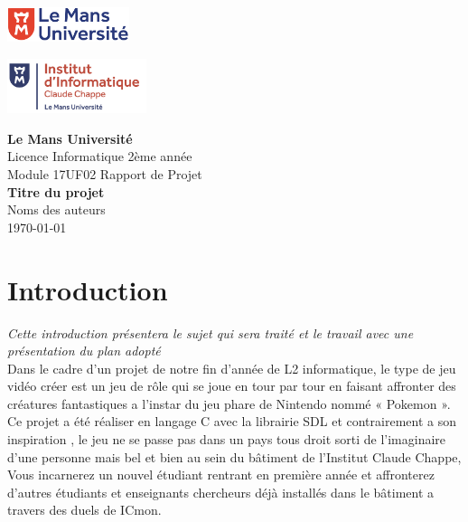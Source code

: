 \documentclass[12pt,a4paper, twoside]{article}
\begin{document}
\begin{titlepage}
    \begin{minipage}[t]{0.48\textwidth}
        \includegraphics[height=1.01cm]{logolemansU.png}
    \end{minipage}
    \hfill
    \begin{minipage}[t]{0.25\textwidth}
        \includegraphics[height=1.6cm]{logo_IC2.png}
    \end{minipage}
    
    \vspace{2cm}
    \begin{center}
        \Large\textbf{Le Mans Université}\\
        \vspace{0.5cm}
        Licence Informatique 2ème année\\
        Module 17UF02 Rapport de Projet\\
        \vspace{0.5cm}
        \Large\textbf{Titre du projet}\\
        \vspace{1cm}
        {\large Noms des auteurs}\\
        \vspace{0.5cm}
        {\normalsize \today} 
    \end{center}
\end{titlepage}

\tableofcontents
\newpage
{}
\section{Introduction}

\emph{Cette introduction présentera le sujet qui sera traité et le travail avec une présentation du plan adopté}\\
Dans le cadre d'un projet de notre fin d'année de L2 informatique, le type de jeu vidéo créer est un jeu de rôle qui se joue en tour par tour en faisant affronter des créatures fantastiques a l’instar du jeu phare de Nintendo nommé « Pokemon ».\\
Ce projet a été réaliser en langage C avec la librairie SDL et contrairement a son inspiration , le jeu ne se passe pas dans un pays tous droit sorti de l’imaginaire d’une personne mais bel et bien au sein du bâtiment de l’Institut Claude Chappe, Vous incarnerez un nouvel étudiant rentrant en première année et affronterez d'autres étudiants et enseignants chercheurs déjà installés dans le bâtiment a travers des duels de ICmon.\\ 
\end{document}
